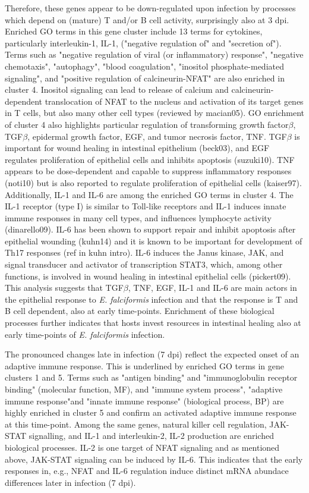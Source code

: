 \documentclass{bmcart}
\begin{document}
 Therefore, these genes appear to be down-regulated upon infection by processes which depend on (mature) T and/or B cell activity, surprisingly also at 3 dpi. Enriched GO terms in this gene cluster include 13 terms for cytokines, particularly interleukin-1, IL-1, ("negative regulation of" and "secretion of"). Terms such as "negative regulation of viral (or inflammatory) response", "negative chemotaxis", "autophagy", "blood coagulation", "inositol phosphate-mediated signaling", and "positive regulation of calcineurin-NFAT" are also enriched in cluster 4. Inositol signaling can lead to release of calcium and calcineurin-dependent translocation of NFAT to the nucleus and activation of its target genes in T cells, but also many other cell types (reviewed by macian05). GO enrichment of cluster 4 also highlights particular regulation of transforming growth factor$\beta$, TGF$\beta$, epidermal growth factor, EGF, and tumor necrosis factor, TNF. TGF$\beta$ is important for wound healing in intestinal epithelium (beck03), and EGF regulates proliferation of epithelial cells and inhibits apoptosis (suzuki10). TNF appears to be dose-dependent and capable to suppress inflammatory responses (noti10) but is also reported to regulate proliferation of epithelial cells (kaiser97). Additionally, IL-1 and IL-6 are among the enriched GO terms in cluster 4. The IL-1 receptor (type I) is similar to Toll-like receptors and IL-1 induces innate immune responses in many cell types, and influences lymphocyte activity (dinarello09). IL-6 has been shown to support repair and inhibit apoptosis after epithelial wounding (kuhn14) and it is known to be important for development of Th17 responses (ref in kuhn intro). 
IL-6 induces the Janus kinase, JAK, and signal transducer and activator of transcription STAT3, which, among other functions, is involved in wound healing in intestinal epithelial cells (pickert09). This analysis suggests that TGF$\beta$, TNF, EGF, IL-1 and IL-6 are main actors in the epithelial response to \textit{E. falciformis} infection and that the response is T and B cell dependent, also at early time-points. Enrichment of these biological processes further indicates that hosts invest resources in intestinal healing also at early time-points of \textit{E. falciformis} infection.
 
\newline The pronounced changes late in infection (7 dpi) reflect the expected onset of an adaptive immune response. This is underlined by enriched GO terms in gene clusters 1 and 5. Terms such as "antigen binding" and "immunoglobulin receptor binding" (molecular function, MF), and "immune system process", "adaptive immune response"and "innate immune response" (biological process, BP) are highly enriched in cluster 5 and confirm an activated adaptive immune response at this time-point. Among the same genes, natural killer cell regulation, JAK-STAT signalling, and IL-1 and interleukin-2, IL-2 production are enriched biological processes. IL-2 is one target of NFAT signaling and as mentioned above, JAK-STAT signaling can be induced by IL-6. This indicates that the early responses in, e.g., NFAT and IL-6 regulation induce distinct mRNA abundace differences later in infection (7 dpi).  
\end{document}
